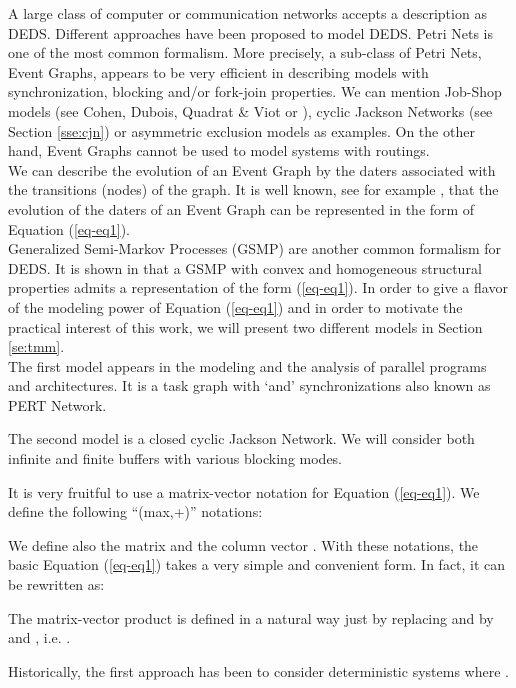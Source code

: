 \documentclass[11pt,titlepage]{article}
\def\eref#1{(\ref{#1})}
\newcommand{\parag}{\medskip\noindent}
\begin{document}
\parag
A large class of computer or communication networks accepts a description as 
DEDS. Different approaches have been proposed to model DEDS. Petri Nets is
one of the most common formalism. 
More precisely, a sub-class of Petri Nets, Event Graphs, appears to be very
efficient in describing models with synchronization, blocking and/or fork-join
properties. We can mention Job-Shop models (see Cohen, Dubois, Quadrat \& Viot
\cite{CDQV85} or \cite{BCOQ}), cyclic
Jackson 
Networks (see Section \ref{sse:cjn}) or asymmetric exclusion
models as 
examples. On the other hand, Event 
Graphs cannot be used to model systems with routings.\\
We can describe the evolution of an Event Graph by the daters associated with
the 
transitions (nodes) of the graph.  It is well known, see for example
\cite{BCOQ},  that the
evolution of the daters of an Event Graph can be represented in
the form of Equation (\ref{eq-eq1}).\\
Generalized Semi-Markov Processes (GSMP) are another common formalism for
DEDS. It is 
shown in \cite{GlYa} that a GSMP with convex and homogeneous structural
properties 
admits a representation of the form (\ref{eq-eq1}).
In order to give a flavor of the modeling power
of Equation 
(\ref{eq-eq1}) and in order to motivate the practical interest of this work, 
we will present two different models in Section
\ref{se:tmm}. \\
\hspace*{1cm}  The first model appears in the modeling and the
analysis of parallel programs and architectures. It is a task graph with `and'
synchronizations also known as PERT Network.

\parag

\hspace*{1cm}  
The second model is a closed cyclic Jackson
Network. We will consider both infinite and finite buffers with various
blocking modes.


\parag
It is very fruitful to use a matrix-vector notation for Equation
\eref{eq-eq1}. We define the following ``(max,+)'' notations:
 
We define also the  matrix 
and the column vector .
With these notations,  the basic
Equation (\ref{eq-eq1}) takes a very simple and convenient form.
In fact, it can be rewritten as:

The matrix-vector product is defined in a natural way just by 
replacing   and
 by  and , i.e. . 

\parag

Historically, the first approach has been
to consider deterministic 
systems where .
\end{document}
